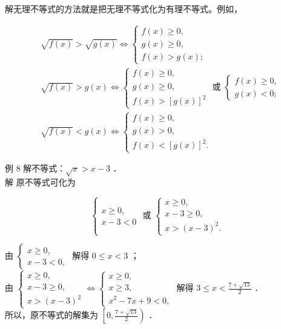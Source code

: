 \documentclass[10pt]{article}
\begin{document}
解无理不等式的方法就是把无理不等式化为有理不等式。例如，

\[
\begin{aligned}
& \sqrt{f(x)}>\sqrt{g(x)} \Leftrightarrow\left\{\begin{array}{l}
f(x) \geqslant 0, \\
g(x) \geqslant 0, \\
f(x)>g(x) ;
\end{array}\right. \\
& \sqrt{f(x)}>g(x) \Leftrightarrow\left\{\begin{array} { l } 
{ f ( x ) \geqslant 0 , } \\
{ g ( x ) \geqslant 0 , } \\
{ f ( x ) > [ g ( x ) ] ^ { 2 } }
\end{array} \text { 或 } \left\{\begin{array}{l}
f(x) \geqslant 0, \\
g(x)<0 ;
\end{array}\right.\right. \\
& \sqrt{f(x)}<g(x) \Leftrightarrow\left\{\begin{array}{l}
f(x) \geqslant 0, \\
g(x)>0, \\
f(x)<[g(x)]^{2} .
\end{array}\right.
\end{aligned}
\]

例 8 解不等式：\(\sqrt{x}>x-3\) ．\\
解 原不等式可化为

\[
\left\{\begin{array} { l } 
{ x \geqslant 0 , } \\
{ x - 3 < 0 }
\end{array} \text { 或 } \left\{\begin{array}{l}
x \geqslant 0, \\
x-3 \geqslant 0, \\
x>(x-3)^{2} .
\end{array}\right.\right.
\]

由 \(\left\{\begin{array}{l}x \geqslant 0, \\ x-3<0,\end{array}\right.\) 解得 \(0 \leqslant x<3\) ；\\
由 \(\left\{\begin{array}{l}x \geqslant 0, \\ x-3 \geqslant 0, \\ x>(x-3)^{2}\end{array} \Leftrightarrow\left\{\begin{array}{l}x \geqslant 0, \\ x \geqslant 3, \\ x^{2}-7 x+9<0,\end{array}\right.\right.\) 解得 \(3 \leqslant x<\frac{7+\sqrt{13}}{2}\) ．\\
所以，原不等式的解集为 \(\left[0, \frac{7+\sqrt{13}}{2}\right)\) ．
\end{document}
